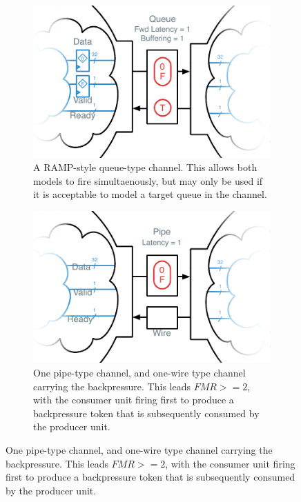 \begin{figure}
    \centering
    \begin{subfigure}[t]{0.49\textwidth}
        \captionsetup{margin=0.25cm}
        \includegraphics[width=\columnwidth]{figures/li-queue-channel-manual.pdf}
        \caption{A RAMP-style queue-type channel. This allows both models to
        fire simultaenously, but may only be used if it is acceptable to model
        a target queue in the channel.}
    \end{subfigure}
    \begin{subfigure}[t]{0.49\textwidth}
        \captionsetup{margin=0.25cm}
        \includegraphics[width=\columnwidth]{figures/li-pipe-channel-manual.pdf}
        \caption{One pipe-type channel, and one-wire type channel carrying the backpressure. This leads $FMR >= 2$, with the consumer unit
        firing first to produce a backpressure token that is subsequently consumed by the producer unit.}

\end{subfigure}
\end{figure}
